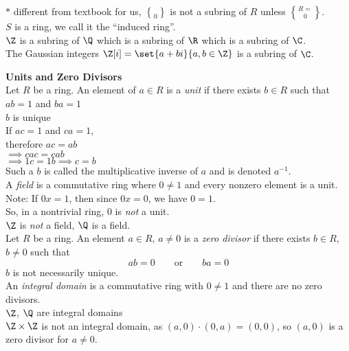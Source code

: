 $*$ different from textbook for us, $\brace0$ is not a subring of $R$ unless $R=\brace0$. \\
\note $S$ is a ring, we call it the ``induced ring''. \\
\ex $\Z$ is a subring of $\Q$ which is a subring of $\R$ which is a subring of $\C$. \\
\ex The Gaussian integers $\Z[i]=\set{a+bi}{a,b\in\Z}$ is a subring of $\C$.

\textbf{Units and Zero Divisors} \\
 Let $R$ be a ring.  An element of $a\in R$ is a \emph{unit} if there exists $b\in R$ such that $ab=1$ and $ba=1$ \\
\remark $b$ is unique \\
\pf If $ac=1$ and $ca=1$, \\
therefore $ac=ab$ \\
$\implies cac=cab$ \\
$\implies 1c = 1b \implies c=b$ \\
Such a $b$ is called the multiplicative inverse of $a$ and is denoted $a^{-1}$. \\
 A \emph{field} is a commutative ring where $0\neq1$ and every nonzero element is a unit. \\
Note: If $0x=1$, then since $0x=0$, we have $0=1$. \\
So, in a nontrivial ring, $0$ is \emph{not} a unit. \\
\ex $\Z$ is \emph{not} a field, $\Q$ is a field. \\
 Let $R$ be a ring.  An element $a\in R$, $a\neq0$ is a \emph{zero divisor} if there exists $b\in R$, $b\neq0$ such that
\[ ab=0 \qquad\text{or}\qquad ba=0 \]
$b$ is not necessarily unique. \\
 An \emph{integral domain} is a commutative ring with $0\neq1$ and there are no zero divisors. \\
\ex $\Z$, $\Q$ are integral domains \\
$\Z\times\Z$ is not an integral domain, as $(a,0)\cdot(0,a)=(0,0)$, so $(a,0)$ is a zero divisor for $a\neq0$.